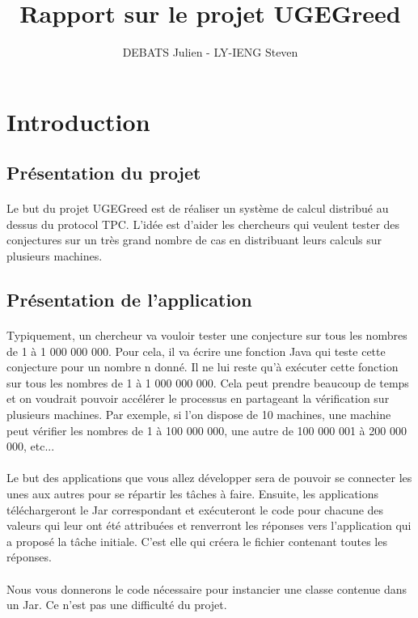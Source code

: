 \documentclass[a4paper,titlepage]{report}
\title{Rapport sur le projet UGEGreed}
\author{DEBATS Julien - LY-IENG Steven}
\begin{document}
\maketitle
\tableofcontents
\pagebreak
\section{Introduction}
\subsection{Présentation du projet}
\paragraph{}
Le but du projet UGEGreed est de réaliser un système de calcul distribué au dessus du protocol TPC. L'idée est d'aider les chercheurs qui veulent tester des conjectures sur un très grand nombre de cas en distribuant leurs calculs sur plusieurs machines.
\subsection{Présentation de l'application}
\paragraph{}
Typiquement, un chercheur va vouloir tester une conjecture sur tous les nombres de 1 à 1 000 000 000. Pour cela, il va écrire une fonction Java qui teste cette conjecture pour un nombre n donné. Il ne lui reste qu'à exécuter cette fonction sur tous les nombres de 1 à 1 000 000 000. Cela peut prendre beaucoup de temps et on voudrait pouvoir accélérer le processus en partageant la vérification sur plusieurs machines. Par exemple, si l'on dispose de 10 machines, une machine peut vérifier les nombres de 1 à 100 000 000, une autre de 100 000 001 à 200 000 000, etc...
\paragraph{}
Le but des applications que vous allez développer sera de pouvoir se connecter les unes aux autres pour se répartir les tâches à faire. Ensuite, les applications téléchargeront le Jar correspondant et exécuteront le code pour chacune des valeurs qui leur ont été attribuées et renverront les réponses vers l'application qui a proposé la tâche initiale. C'est elle qui créera le fichier contenant toutes les réponses.
\paragraph{}
Nous vous donnerons le code nécessaire pour instancier une classe contenue dans un Jar. Ce n'est pas une difficulté du projet.
\end{document}

